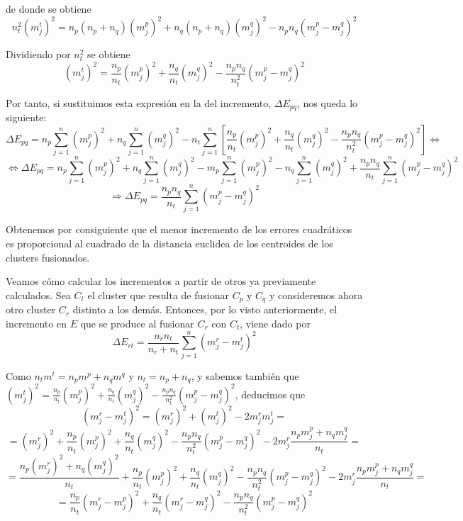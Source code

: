de donde se obtiene
\[
n_{t}^{2}(m^{t}_{j})^{2} = n_{p}(n_{p}+n_{q})(m^{p}_{j})^{2} + n_{q}(n_{p}+n_{q})(m^{q}_{j})^{2} - n_{p}n_{q}(m_{j}^{p}-m_{j}^{q})^{2}
\]

Dividiendo por $n_{t}^{2}$ se obtiene
\[
(m_{j}^{t})^{2} = \frac{n_{p}}{n_{t}}(m^{p}_{j})^{2} + \frac{n_{q}}{n_{t}}(m_{j}^{q})^{2} - \frac{n_{p}n_{q}}{n_{t}^{2}}(m^{p}_{j}-m^{q}_{j})^{2}
\]

Por tanto, si sustituimos esta expresión en la del incremento, $\Delta E_{pq}$, nos queda lo siguiente:
\[
\Delta E_{pq} = n_{p}\sum_{j=1}^{n}(m^{p}_{j})^{2} + n_{q}\sum_{j=1}^{n}(m^{q}_{j})^{2} - n_{t}\sum_{j=1}^{n} \left[\frac{n_{p}}{n_{t}}(m^{p}_{j})^{2} + \frac{n_{q}}{n_{t}}(m_{j}^{q})^{2} - \frac{n_{p}n_{q}}{n_{t}^{2}}(m^{p}_{j}-m^{q}_{j})^{2}\right] \Longleftrightarrow
\]
\[
\Longleftrightarrow \Delta E_{pq} = n_{p}\sum_{j=1}^{n}(m^{p}_{j})^{2} + n_{q}\sum_{j=1}^{n}(m^{q}_{j})^{2} - m_{p}\sum_{j=1}^{n}(m_{j}^{p})^{2} - n_{q}\sum_{j=1}^{n}(m^{q}_{j})^{2} + \frac{n_{p}n_{q}}{n_{t}}\sum_{j=1}^{n}(m^{p}_{j}-m^{q}_{j})^{2}
\]
\vspace{0.5cm}
\[
\Rightarrow \Delta E_{pq} = \frac{n_{p}n_{q}}{n_{t}}\sum_{j=1}^{n}(m^{p}_{j}-m^{q}_{j})^{2}
\]

Obtenemos por consiguiente que el menor incremento de los errores cuadráticos es proporcional al cuadrado de la distancia euclidea de los centroides de los clusters fusionados. \newline

Veamos cómo calcular los incrementos a partir de otros ya previamente calculados. \newline
Sea $C_{t}$ el cluster que resulta de fusionar $C_{p}$ y $C_{q}$ y consideremos ahora otro cluster $C_{r}$ distinto a los demás. Entonces, por lo visto anteriormente, 
el incremento en $E$ que se produce al fusionar $C_{r}$ con $C_{t}$, viene dado por
\[
\Delta E_{rt} = \frac{n_{r}n_{t}}{n_{r}+n_{t}}\sum_{j=1}^{n}(m^{r}_{j}-m^{t}_{j})^{2}
\]

Como $n_{t}m^{t} = n_{p}m^{p} + n_{q}m^{q}$ y $n_{t} = n_{p}+n_{q}$, y sabemos también que $(m_{j}^{t})^{2} = \frac{n_{p}}{n_{t}}(m^{p}_{j})^{2} + \frac{n_{q}}{n_{t}}(m_{j}^{q})^{2} - \frac{n_{p}n_{q}}{n_{t}^{2}}(m^{p}_{j}-m^{q}_{j})^{2}$, deducimos que
\[
(m^{r}_{j}-m^{t}_{j})^{2} = (m^{r}_{j})^{2} + (m^{t}_{j})^{2} - 2m_{j}^{r}m_{j}^{t} = 
\]
\[
= (m_{j}^{r})^{2} + \frac{n_{p}}{n_{t}}(m^{p}_{j})^{2} + \frac{n_{q}}{n_{t}}(m^{q}_{j})^{2} - \frac{n_{p}n_{q}}{n_{t}^{2}}(m^{p}_{j}-m^{q}_{j})^{2} - 2m^{r}_{j}\frac{n_{p}m^{p}_{j} + n_{q}m^{q}_{j}}{n_{t}} = 
\]
\[
= \frac{n_{p}(m_{j}^{r})^{2}+n_{q}(m_{j}^{q})^{2}}{n_{t}} + \frac{n_{p}}{n_{t}}(m^{p}_{j})^{2} + \frac{n_{q}}{n_{t}}(m^{q}_{j})^{2} - \frac{n_{p}n_{q}}{n^{2}_{t}}(m^{p}_{j}-m^{q}_{j})^{2} - 2m^{r}_{j}\frac{n_{p}m^{p}_{j} + n_{q}m^{q}_{j}}{n_{t}} = 
\]
\[
= \frac{n_{p}}{n_{t}}(m^{r}_{j} - m^{p}_{j})^{2} + \frac{n_{q}}{n_{t}}(m^{r}_{j} - m^{q}_{j})^{2} - \frac{n_{p}n_{q}}{n_{t}^{2}}(m^{p}_{j}-m^{q}_{j})^{2}
\]

